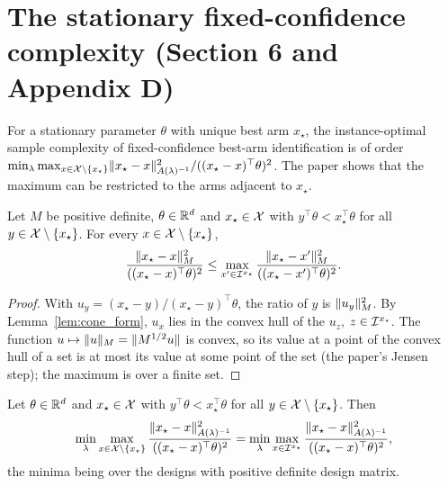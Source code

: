 \chapter{The stationary fixed-confidence complexity (Section 6 and Appendix D)}
\label{chap:stationary}

For a stationary parameter $\theta$ with unique best arm $x_\star$, the instance-optimal sample
complexity of fixed-confidence best-arm identification is of order
$\min_\lambda \max_{x \in \mathcal{X} \setminus \{x_\star\}} \lVert x_\star - x \rVert^2_{A(\lambda)^{-1}} /
((x_\star - x)^\top \theta)^2$. The paper shows that the maximum can be restricted to the arms
adjacent to $x_\star$.

\begin{lemma}
  \label{lem:ratio_adjacent}
  \leanok
  Let $M$ be positive definite, $\theta \in \mathbb{R}^d$ and $x_\star \in \mathcal{X}$ with
  $y^\top \theta < x_\star^\top \theta$ for all $y \in \mathcal{X} \setminus \{x_\star\}$. For every
  $x \in \mathcal{X} \setminus \{x_\star\}$,
  \[
    \frac{\lVert x_\star - x \rVert_M^2}{((x_\star - x)^\top \theta)^2}
    \le \max_{x' \in \mathcal{I}^{x_\star}} \frac{\lVert x_\star - x' \rVert_M^2}{((x_\star - x')^\top \theta)^2}.
  \]
\end{lemma}

\begin{proof}
  \leanok
  With $u_y = (x_\star - y) / (x_\star - y)^\top \theta$, the ratio of $y$ is $\lVert u_y \rVert_M^2$. By
  Lemma~\ref{lem:cone_form}, $u_x$ lies in the convex hull of the $u_z$, $z \in \mathcal{I}^{x_\star}$. The
  function $u \mapsto \lVert u \rVert_M = \lVert M^{1/2} u \rVert$ is convex, so its value at a point of the
  convex hull of a set is at most its value at some point of the set (the paper's Jensen step);
  the maximum is over a finite set.
\end{proof}

\begin{proposition}[Proposition 1]
  \label{prop:stat_equiv}
  \leanok
  Let $\theta \in \mathbb{R}^d$ and $x_\star \in \mathcal{X}$ with $y^\top \theta < x_\star^\top \theta$ for all
  $y \in \mathcal{X} \setminus \{x_\star\}$. Then
  \[
    \min_\lambda \max_{x \in \mathcal{X} \setminus \{x_\star\}}
      \frac{\lVert x_\star - x \rVert^2_{A(\lambda)^{-1}}}{((x_\star - x)^\top \theta)^2}
    = \min_\lambda \max_{x \in \mathcal{I}^{x_\star}}
      \frac{\lVert x_\star - x \rVert^2_{A(\lambda)^{-1}}}{((x_\star - x)^\top \theta)^2},
  \]
  the minima being over the designs with positive definite design matrix.
\end{proposition}

